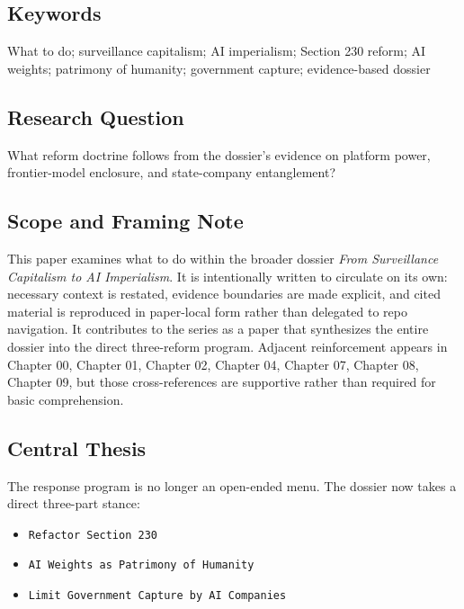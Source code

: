 \documentclass[
  american,
  11pt,
  letterpaper,
]{article}
\providecommand{\tightlist}{%
  \setlength{\itemsep}{0pt}\setlength{\parskip}{0pt}}
\begin{document}
\subsection{Keywords}\label{keywords-10}

What to do; surveillance capitalism; AI imperialism; Section 230 reform;
AI weights; patrimony of humanity; government capture; evidence-based
dossier

\subsection{Research Question}\label{research-question-10}

What reform doctrine follows from the dossier's evidence on platform
power, frontier-model enclosure, and state-company entanglement?

\subsection{Scope and Framing Note}\label{scope-and-framing-note-10}

This paper examines what to do within the broader dossier \emph{From
Surveillance Capitalism to AI Imperialism}. It is intentionally written
to circulate on its own: necessary context is restated, evidence
boundaries are made explicit, and cited material is reproduced in
paper-local form rather than delegated to repo navigation. It
contributes to the series as a paper that synthesizes the entire dossier
into the direct three-reform program. Adjacent reinforcement appears in
Chapter 00, Chapter 01, Chapter 02, Chapter 04, Chapter 07, Chapter 08,
Chapter 09, but those cross-references are supportive rather than
required for basic comprehension.

\subsection{Central Thesis}\label{central-thesis-10}

The response program is no longer an open-ended menu. The dossier now
takes a direct three-part stance:

\begin{itemize}
\tightlist
\item
  \texttt{Refactor\ Section\ 230}
\item
  \texttt{AI\ Weights\ as\ Patrimony\ of\ Humanity}
\item
  \texttt{Limit\ Government\ Capture\ by\ AI\ Companies}
\end{itemize}
\end{document}

